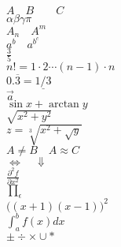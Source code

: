 \documentclass{article}
\date=06
\begin{document}
$A\quad B\qquad C$\\
$ \alpha \beta \gamma \pi$\\
$A_n \quad A^m$\\
$a^b \quad a^{b^c}$\\
$\frac{3}{5}$\\
$n! = 1 \cdot 2 \cdots (n-1) \cdot n$\\
$0.\overline{3} = \underline{1/3}$\\
$\vec{a}$\\
$\sin x + \arctan y$\\
$\sqrt{x^2+y^2}$\\
$z=\sqrt[3]{x^{2} + \sqrt{y}}$\\
$A \neq B \quad A \approx C \quad $\\
$\Leftrightarrow\quad\Downarrow$\\
$\frac{\partial ^2f}{\partial x^2}$\\
$\prod_\epsilon$\\
$\Big((x+1)(x-1)\Big)^{2}$\\
$\int_a^b f(x) dx$\\
$\pm \div \times \cup \ast $
\end{document}
